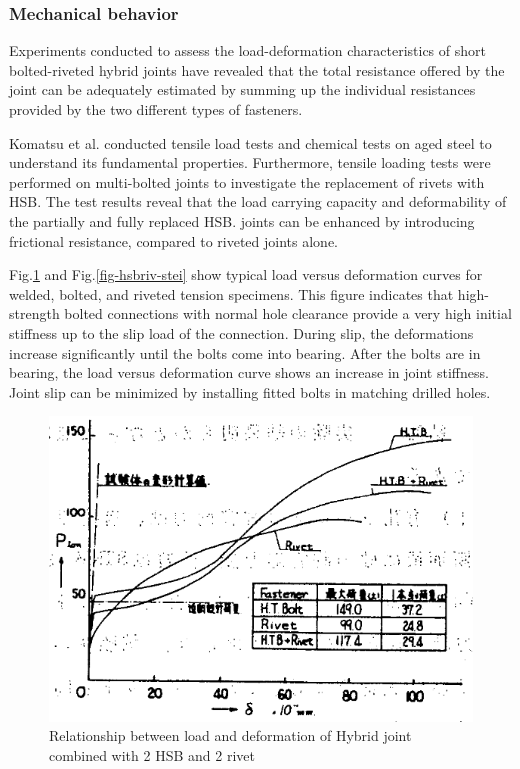 \subsubsection{Mechanical behavior}

Experiments conducted to assess the load-deformation characteristics of short bolted-riveted hybrid joints have revealed that the total resistance offered by the joint can be adequately estimated by summing up the individual resistances provided by the two different types of fasteners.

Komatsu et al.\cite{KOMATSU2015} conducted tensile load tests and chemical tests on aged steel to understand its fundamental properties. Furthermore, tensile loading tests were performed on multi-bolted joints to investigate the replacement of rivets with HSB. The test results reveal that the load carrying capacity and deformability of the partially and fully replaced HSB. joints can be enhanced by introducing frictional resistance, compared to riveted joints alone.

Fig.\ref{fig-hsbriv-fune} \cite{funahashi1967Experimental} and Fig.\ref{fig-hsbriv-stei} \cite{steinhardt1969-hybrid} show typical load versus deformation curves for welded, bolted, and riveted tension specimens. This figure indicates that high-strength bolted connections with normal hole clearance provide a very high initial stiffness up to the slip load of the connection. During slip, the deformations increase significantly until the bolts come into bearing. After the bolts are in bearing, the load versus deformation curve shows an increase in joint stiffness. Joint slip can be minimized by installing fitted bolts in matching drilled holes.

\begin{figure}[htbp]
    \centering
\includegraphics[width=0.75\linewidth]{imgs//ch2/hsbrivet-1967-pd.png}
    \caption{Relationship between load and deformation of Hybrid joint combined with 2 HSB and 2 rivet \cite{funahashi1967Experimental}}
    \label{fig-hsbriv-fune}
\end{figure}

